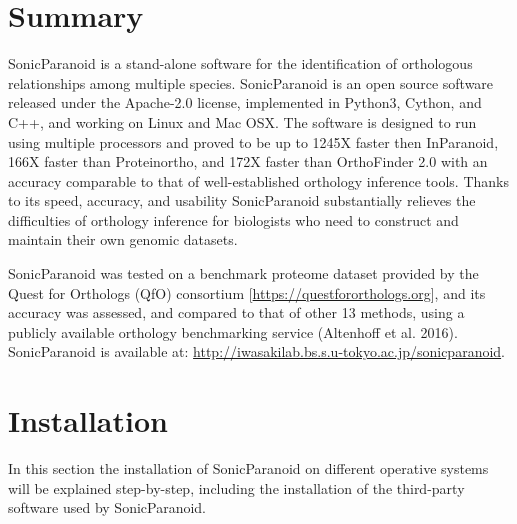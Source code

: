 \documentclass[12pt]{article} %
\begin{document}

\tableofcontents %

\newpage %


\section{Summary} %
SonicParanoid is a stand-alone software for the identification of orthologous relationships among multiple species. SonicParanoid is an open source software released under the Apache-2.0 license, implemented in Python3, Cython, and C++, and working on Linux and Mac OSX. The software is designed to run using multiple processors and proved to be up to 1245X faster then InParanoid, 166X faster than Proteinortho, and 172X faster than OrthoFinder 2.0 with an accuracy comparable to that of well-established orthology inference tools. Thanks to its speed, accuracy, and usability SonicParanoid substantially relieves the difficulties of orthology inference for biologists who need to construct and maintain their own genomic datasets.

SonicParanoid was tested on a benchmark proteome dataset provided by the Quest for Orthologs (QfO) consortium [\url{https://questfororthologs.org}], and its accuracy was assessed, and compared to that of other 13 methods, using a publicly available orthology benchmarking service (Altenhoff et al. 2016).\newline
SonicParanoid is available at: \newline \url{http://iwasakilab.bs.s.u-tokyo.ac.jp/sonicparanoid}.


\section{Installation} %
In this section the installation of SonicParanoid on different operative systems
will be explained step-by-step, including the installation of the third-party software used by SonicParanoid.
\end{document}
